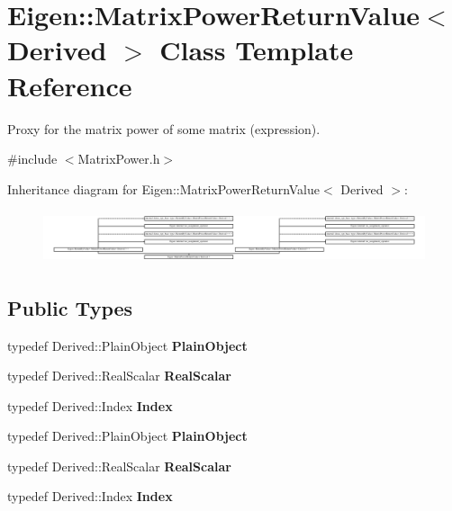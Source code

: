 \hypertarget{class_eigen_1_1_matrix_power_return_value}{}\section{Eigen\+:\+:Matrix\+Power\+Return\+Value$<$ Derived $>$ Class Template Reference}
\label{class_eigen_1_1_matrix_power_return_value}


Proxy for the matrix power of some matrix (expression).  




{\ttfamily \#include $<$Matrix\+Power.\+h$>$}

Inheritance diagram for Eigen\+:\+:Matrix\+Power\+Return\+Value$<$ Derived $>$\+:\begin{figure}[H]
\begin{center}
\leavevmode
\includegraphics[height=1.573034cm]{class_eigen_1_1_matrix_power_return_value}
\end{center}
\end{figure}
\subsection*{Public Types}
\begin{DoxyCompactItemize}
\item 
\mbox{\label{class_eigen_1_1_matrix_power_return_value_acb032a9e2bea82ee03a8bfdb512641c1}} 
typedef Derived\+::\+Plain\+Object {\bfseries Plain\+Object}
\item 
\mbox{\label{class_eigen_1_1_matrix_power_return_value_a37d33214821749595a28956e75746349}} 
typedef Derived\+::\+Real\+Scalar {\bfseries Real\+Scalar}
\item 
\mbox{\label{class_eigen_1_1_matrix_power_return_value_a1a41f8c1f82156b8f0c1d938627997e0}} 
typedef Derived\+::\+Index {\bfseries Index}
\item 
\mbox{\label{class_eigen_1_1_matrix_power_return_value_acb032a9e2bea82ee03a8bfdb512641c1}} 
typedef Derived\+::\+Plain\+Object {\bfseries Plain\+Object}
\item 
\mbox{\label{class_eigen_1_1_matrix_power_return_value_a37d33214821749595a28956e75746349}} 
typedef Derived\+::\+Real\+Scalar {\bfseries Real\+Scalar}
\item 
\mbox{\label{class_eigen_1_1_matrix_power_return_value_a1a41f8c1f82156b8f0c1d938627997e0}} 
typedef Derived\+::\+Index {\bfseries Index}
\end{DoxyCompactItemize}
